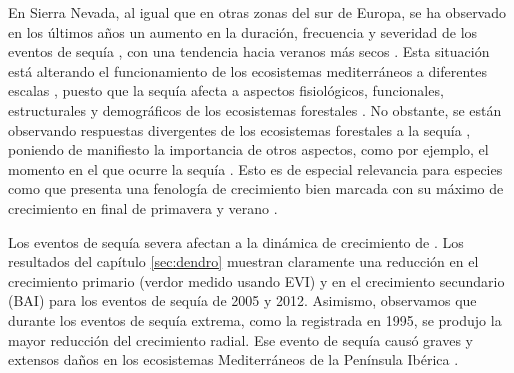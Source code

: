 En Sierra Nevada, al igual que en otras zonas del sur de Europa, se ha observado en los últimos años un aumento en la duración, frecuencia y severidad de los eventos de sequía \autocites[ver capítulo \ref{sec:dendro} y apéndice \ref{sec:appendix:dendro};][]{VicenteSerranoetal2014EvidenceIncreasing,Staggeetal2017ObservedDrought,Spinonietal2015EuropeanDrought,Pascoaetal2017DroughtTrends}, con una tendencia hacia veranos más secos \autocites{Spinonietal2017PanEuropeanSeasonal}. Esta situación está alterando el funcionamiento de los ecosistemas mediterráneos a diferentes escalas \autocites{Penuelasetal2017ImpactsGlobal,Forneretal2018ExtremeDroughts,Liuetal2020EffectsDecadal,OgayaPenuelas2021ClimateChange}, puesto que la sequía afecta a aspectos fisiológicos, funcionales, estructurales y demográficos de los ecosistemas forestales \autocites{Allenetal2010GlobalOverview, Assaletal2016SpatialTemporal}. No obstante, se están observando respuestas divergentes de los ecosistemas forestales a la sequía \autocites{Andereggetal2020DivergentForest}, poniendo de manifiesto la importancia de otros aspectos, como por ejemplo, el momento en el que ocurre la sequía \autocites{Huangetal2018DroughtTiming}. Esto es de especial relevancia para especies como \Qp que presenta una fenología de crecimiento bien marcada con su máximo de crecimiento en final de primavera y verano \autocites{PerezdeLisetal2016ChangesSpring}. 

Los eventos de sequía severa afectan a la dinámica de crecimiento de \Qp. Los resultados del capítulo \ref{sec:dendro} muestran claramente una reducción en el crecimiento primario (verdor medido usando EVI) y en el crecimiento secundario (BAI) para los eventos de sequía de 2005 y 2012. Asimismo, observamos que durante los eventos de sequía extrema, como la registrada en 1995, se produjo la mayor reducción del crecimiento radial. Ese evento de sequía causó graves y extensos daños en los ecosistemas Mediterráneos de la Península Ibérica \autocite{Penuelasetal2001SevereDrought,Gazoletal2018ForestResilience}. 

